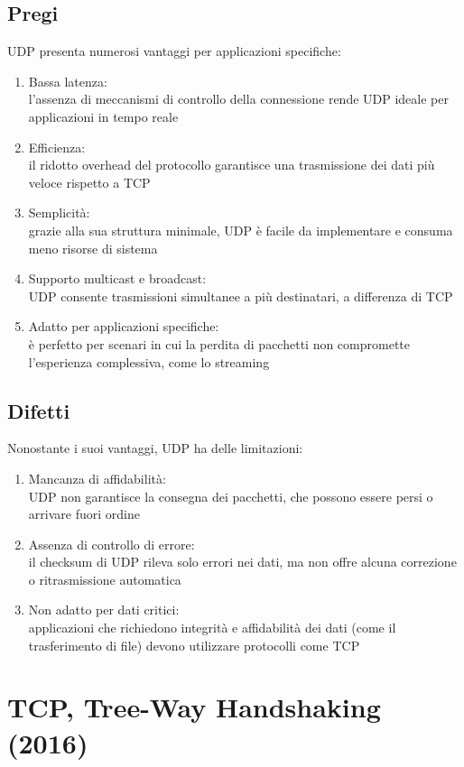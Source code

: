 \documentclass[10pt,oneside,a4paper]{article}
\begin{document}
\subsection{Pregi}
UDP presenta numerosi vantaggi per applicazioni specifiche:
\begin{enumerate}
\item Bassa latenza:\\
l'assenza di meccanismi di controllo della connessione rende UDP ideale per applicazioni in tempo reale
\item Efficienza:\\
il ridotto overhead del protocollo garantisce una trasmissione dei dati più veloce rispetto a TCP
\item Semplicità:\\
grazie alla sua struttura minimale, UDP è facile da implementare e consuma meno risorse di sistema
\item Supporto multicast e broadcast:\\
UDP consente trasmissioni simultanee a più destinatari, a differenza di TCP
\item Adatto per applicazioni specifiche:\\
è perfetto per scenari in cui la perdita di pacchetti non compromette l'esperienza complessiva, come lo streaming
\end{enumerate}
\subsection{Difetti}
Nonostante i suoi vantaggi, UDP ha delle limitazioni:
\begin{enumerate}
\item Mancanza di affidabilità:\\
UDP non garantisce la consegna dei pacchetti, che possono essere persi o arrivare fuori ordine
\item Assenza di controllo di errore:\\
il checksum di UDP rileva solo errori nei dati, ma non offre alcuna correzione o ritrasmissione automatica
\item Non adatto per dati critici:\\
applicazioni che richiedono integrità e affidabilità dei dati (come il trasferimento di file) devono utilizzare protocolli come TCP
\end{enumerate}
\section{TCP, Tree-Way Handshaking (2016)}
\end{document}

